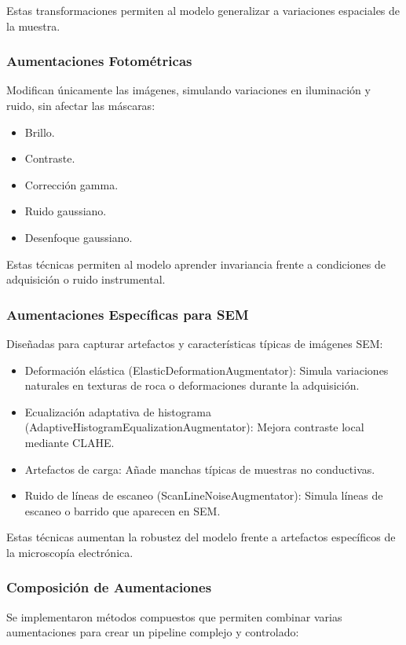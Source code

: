 \documentclass[onecolumn, 12pt , journal]{IEEEtran}
\begin{document}
Estas transformaciones permiten al modelo generalizar a variaciones espaciales de la muestra.

\subsubsection{Aumentaciones Fotométricas}

Modifican únicamente las imágenes, simulando variaciones en iluminación y ruido, sin afectar las máscaras:

\begin{itemize}
    \item Brillo.
    \item Contraste.
    \item Corrección gamma.
    \item Ruido gaussiano.
    \item Desenfoque gaussiano.
\end{itemize}

Estas técnicas permiten al modelo aprender invariancia frente a condiciones de adquisición o ruido instrumental.

\subsubsection{Aumentaciones Específicas para SEM}
Diseñadas para capturar artefactos y características típicas de imágenes SEM:

\begin{itemize}
    \item Deformación elástica (ElasticDeformationAugmentator): Simula variaciones naturales en texturas de roca o deformaciones durante la adquisición.
    \item Ecualización adaptativa de histograma (AdaptiveHistogramEqualizationAugmentator): Mejora contraste local mediante CLAHE.
    \item Artefactos de carga: Añade manchas típicas de muestras no conductivas.
    \item Ruido de líneas de escaneo (ScanLineNoiseAugmentator): Simula líneas de escaneo o barrido que aparecen en SEM.
\end{itemize}

Estas técnicas aumentan la robustez del modelo frente a artefactos específicos de la microscopía electrónica.

\subsubsection{Composición de Aumentaciones}
Se implementaron métodos compuestos que permiten combinar varias aumentaciones para crear un pipeline complejo y controlado:
\end{document}
